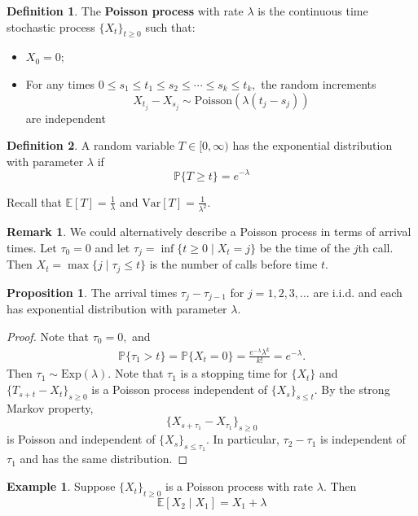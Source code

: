 \documentclass[10pt, oneside]{article}
\newcommand{\bbP}{\mathbb{P}}
\newcommand{\bbE}{\mathbb{E}}
\newcommand{\Var}{\text{Var}}
\theoremstyle{definition}
\newtheorem{exmp}{Example}[section]
\newtheorem{defn}{Definition}
\newtheorem{prop}{Proposition}
\newtheorem{rem}{Remark}
\begin{document}
\begin{defn}
    The \textbf{Poisson process} with rate $\lambda$ is the continuous time stochastic process $\{X_t\}_{t\geq 0}$ such that:
    \begin{itemize}
        \item $X_0 = 0;$
        \item For any times $0 \leq s_1 \leq t_1 \leq s_2 \leq \cdots \leq s_k \leq t_k,$ the random increments 
        \[X_{t_j} - X_{s_j} \sim \text{Poisson}(\lambda (t_j - s_j))\] are independent
    \end{itemize}
\end{defn}

\begin{defn}
    A random variable $T \in [0, \infty)$ has the exponential distribution with parameter $\lambda$ if 
    \[\bbP\{T \geq t\} = e^{-\lambda}\]
\end{defn}
Recall that $\bbE[T] = \frac{1}{\lambda}$ and $\Var[T] = \frac{1}{\lambda^2}.$

\begin{rem}
    We could alternatively describe a Poisson process in terms of arrival times. Let $\tau_0 = 0$ and let $\tau_j = \inf\{t \geq 0 \mid X_t = j\}$ be the time of the $j$th call. Then $X_t = \max\{j \mid \tau_j \leq t\}$ is the number of calls before time $t.$ 
\end{rem}

\begin{prop}
    The arrival times $\tau_j - \tau_{j-1}$ for $j = 1,2,3,\dots$ are i.i.d. and each has exponential distribution with parameter $\lambda.$
\end{prop}
\begin{proof}
    Note that $\tau_0 = 0,$ and 
    \begin{align*}
        \bbP\{\tau_1 > t\} = \bbP\{X_t = 0\} = \frac{e^{-\lambda }\lambda^k}{k!} = e^{-\lambda}.
    \end{align*}
    Then $\tau_1 \sim \text{Exp}(\lambda).$ Note that $\tau_1$ is a stopping time for $\{X_t\}$ and $\{T_{s + t} - X_t\}_{s\geq0}$ is a Poisson process independent of $\{X_s\}_{s\leq t}.$ By the strong Markov property, 
    \[\{X_{s + \tau_1} - X_{\tau_1}\}_{s\geq 0}\] is Poisson and independent of $\{X_{s}\}_{s\leq \tau_1}.$ In particular, $\tau_2 - \tau_1$ is independent of $\tau_1$ and has the same distribution.
\end{proof}

\begin{exmp}
    Suppose $\{X_t\}_{t\geq 0}$ is a Poisson process with rate $\lambda.$ Then 
    \[\bbE[X_2 \mid X_1] = X_1 + \lambda\]
\end{exmp}
\end{document}
